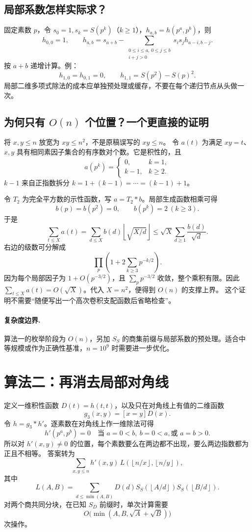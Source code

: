 \documentclass[UTF8,a4paper,11pt,twoside,openright,fontset=fandol]{ctexbook}
\theoremstyle{definition}
\newcommand{\floor}[1]{\left\lfloor #1\right\rfloor}
\begin{document}
\subsection{局部系数怎样实际求？}
固定素数 $p$，令 $s_0=1,s_k=S(p^k)$（$k\ge1$），$h_{a,b}=h(p^a,p^b)$，则
\[
 h_{0,0}=1,\qquad
 h_{a,b}=s_{a+b}-\sum_{\substack{0\le i\le a,\,0\le j\le b\\i+j>0}}
 s_i s_j h_{a-i,b-j}.
\]
按 $a+b$ 递增计算。例：
\[
 h_{1,0}=h_{0,1}=0,\qquad h_{1,1}=S(p^2)-S(p)^2.
\]
局部二维多项式除法的成本应单独预处理或缓存，不要在每个递归节点从头做一次。

\subsection{为何只有 \texorpdfstring{$O(n)$}{O(n)} 个位置？一个更直接的证明}
将 $x,y\le n$ 放宽为 $xy\le n^2$，不是原稿误写的 $xy\le n$。
令 $a(t)$ 为满足 $xy=t$、$x,y$ 具有相同素因子集合的有序数对个数。它是积性的，且
\[
 a(p^k)=\begin{cases}0,&k=1,\\k-1,&k\ge2.\end{cases}
\]
$k-1$ 来自正指数拆分 $k=1+(k-1)=\cdots=(k-1)+1$。

令 $T_2$ 为完全平方数的示性函数，写 $a=T_2*b$。局部生成函数相乘可得
\[
 b(p)=b(p^2)=0,\qquad b(p^k)=2\ (k\ge3).
\]
于是
\[
\sum_{t\le X}a(t)=\sum_{d\le X}b(d)\floor{\sqrt{X/d}}
\le\sqrt X\sum_{d\ge1}\frac{b(d)}{\sqrt d}.
\]
右边的级数可分解成
\[
 \prod_p\left(1+2\sum_{k\ge3}p^{-k/2}\right).
\]
因为每个局部因子为 $1+O(p^{-3/2})$，且 $\sum_p p^{-3/2}$ 收敛，整个乘积有限。因此 $\sum_{t\le X}a(t)=O(\sqrt X)$。代入 $X=n^2$，便得到 $O(n)$ 的支撑上界。
这个证明不需要“随便写出一个高次卷积支配函数后省略检查”。

\paragraph{复杂度边界.} 算法一的枚举阶段为 $O(n)$，另加 $S_S$ 的商集前缀与局部系数的预处理。适合中等规模或作为正确性基准，$n=10^9$ 时需要进一步优化。


\section{算法二：再消去局部对角线}
定义一维积性函数 $D(t)=h(t,t)$，以及只在对角线上有值的二维函数
\[
 g_3(x,y)=[x=y]D(x).
\]
令 $h=g_3*h'$。逐素数在对角线上作一维除法可得
\[
 h'(p^a,p^b)=0\quad\text{当 }a=0<b,\ b=0<a,\text{或 }a=b>0.
\]
所以对 $h'(x,y)\ne0$ 的位置，每个素数要么在两边都不出现，要么两边指数都为正且不相等。
答案转为
\[
 \sum_{x,y\le n}h'(x,y)\,L(\floor{n/x},\floor{n/y}),
\]
其中
\[
 L(A,B)=\sum_{d\le\min(A,B)}D(d)
 S_S(\floor{A/d})S_S(\floor{B/d}).
\]
对两个商共同分块，在已知 $S_D$ 前缀时，单次计算需要
\[
 O\bigl(\min(A,B,\sqrt A+\sqrt B)\bigr)
\]
次操作。
\end{document}
